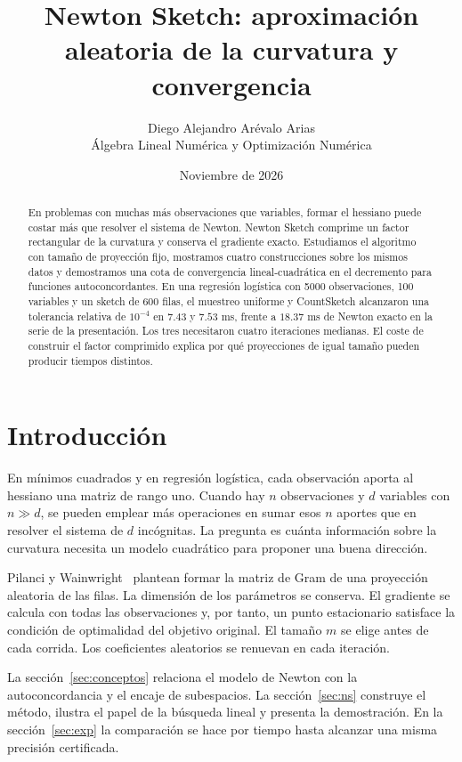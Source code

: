 \documentclass[11pt,a4paper]{article}
\title{Newton Sketch: aproximación aleatoria de la curvatura y convergencia}
\author{Diego Alejandro Arévalo Arias\\[2pt]\small Álgebra Lineal Numérica y Optimización Numérica}
\date{Noviembre de 2026}
\begin{document}
\renewcommand{\abstractname}{Resumen}\renewcommand{\proofname}{Demostración}
\renewcommand{\refname}{Referencias}\renewcommand{\tablename}{Tabla}
\maketitle
\begin{abstract}
En problemas con muchas más observaciones que variables, formar el hessiano puede costar más que resolver el sistema de Newton. Newton Sketch comprime un factor rectangular de la curvatura y conserva el gradiente exacto. Estudiamos el algoritmo con tamaño de proyección fijo, mostramos cuatro construcciones sobre los mismos datos y demostramos una cota de convergencia lineal-cuadrática en el decremento para funciones autoconcordantes. En una regresión logística con 5000 observaciones, 100 variables y un sketch de 600 filas, el muestreo uniforme y CountSketch alcanzaron una tolerancia relativa de $10^{-4}$ en $7.43$ y $7.53$ ms, frente a $18.37$ ms de Newton exacto en la serie de la presentación. Los tres necesitaron cuatro iteraciones medianas. El coste de construir el factor comprimido explica por qué proyecciones de igual tamaño pueden producir tiempos distintos.
\end{abstract}

\section{Introducción}
En mínimos cuadrados y en regresión logística, cada observación aporta al hessiano una matriz de rango uno. Cuando hay $n$ observaciones y $d$ variables con $n\gg d$, se pueden emplear más operaciones en sumar esos $n$ aportes que en resolver el sistema de $d$ incógnitas. La pregunta es cuánta información sobre la curvatura necesita un modelo cuadrático para proponer una buena dirección.

Pilanci y Wainwright~\cite{PW17} plantean formar la matriz de Gram de una proyección aleatoria de las filas. La dimensión de los parámetros se conserva. El gradiente se calcula con todas las observaciones y, por tanto, un punto estacionario satisface la condición de optimalidad del objetivo original. El tamaño $m$ se elige antes de cada corrida. Los coeficientes aleatorios se renuevan en cada iteración.

La sección~\ref{sec:conceptos} relaciona el modelo de Newton con la autoconcordancia y el encaje de subespacios. La sección~\ref{sec:ns} construye el método, ilustra el papel de la búsqueda lineal y presenta la demostración. En la sección~\ref{sec:exp} la comparación se hace por tiempo hasta alcanzar una misma precisión certificada.
\end{document}
